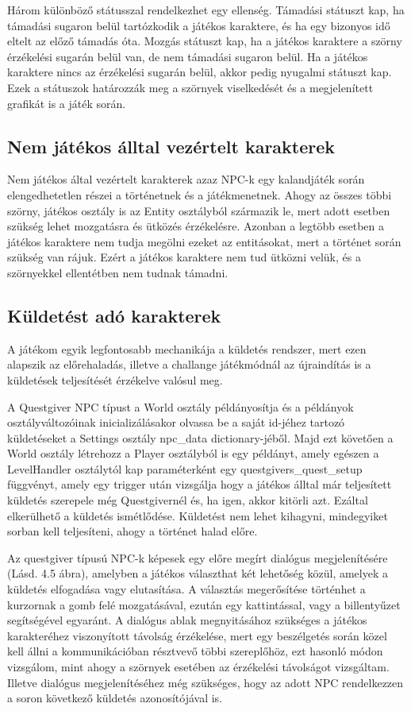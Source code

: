 Három különböző státusszal rendelkezhet egy ellenség. Támadási státuszt kap, ha támadási sugaron belül tartózkodik a játékos karaktere, és ha egy bizonyos idő eltelt az előző támadás óta. Mozgás státuszt kap, ha a játékos karaktere a szörny érzékelési sugarán belül van, de nem támadási sugaron belül. Ha a játékos karaktere nincs az érzékelési sugarán belül, akkor pedig nyugalmi státuszt kap. Ezek a státuszok határozzák meg a szörnyek viselkedését és a megjelenített grafikát is a játék során.


\subsection{Nem játékos álltal vezértelt karakterek}

\indent \indent Nem játékos által vezértelt karakterek azaz NPC-k egy kalandjáték során elengedhetetlen részei a történetnek és a játékmenetnek. Ahogy az összes többi szörny, játékos osztály is az Entity osztályból származik le, mert adott esetben szükség lehet mozgatásra és ütközés érzékelésre. Azonban a legtöbb esetben a játékos karaktere nem tudja megölni ezeket az entitásokat, mert a történet során szükség van rájuk. Ezért a játékos karaktere nem tud ütközni velük, és a szörnyekkel ellentétben nem tudnak támadni.

\subsection{Küldetést adó karakterek}

\indent \indent A játékom egyik legfontosabb mechanikája a küldetés rendszer, mert ezen alapszik az előrehaladás, illetve a challange játékmódnál az újraindítás is a küldetések teljesítését érzékelve valósul meg. 

A Questgiver NPC típust a World osztály példányosítja és a példányok osztályváltozóinak inicializálásakor olvassa be a saját id-jéhez tartozó küldetéseket a Settings osztály npc\_data dictionary-jéből. Majd ezt követően a World osztály létrehozz a Player osztályból is egy példányt, amely egészen a LevelHandler osztálytól kap paraméterként egy questgivers\_quest\_setup függvényt, amely egy trigger után vizsgálja hogy a játékos álltal már teljesített küldetés szerepel\-e még Questgivernél és, ha igen, akkor kitörli azt. Ezáltal elkerülhető a küldetés ismétlődése. Küldetést nem lehet kihagyni, mindegyiket sorban kell teljesíteni, ahogy a történet halad előre.

Az questgiver típusú NPC-k képesek egy előre megírt dialógus megjelenítésére (Lásd. 4.5 ábra), amelyben a játékos választhat két lehetőség közül, amelyek a küldetés elfogadása vagy elutasítása. A választás megerősítése történhet a kurzornak a gomb felé mozgatásával, ezután egy kattintással, vagy a billentyűzet segítségével egyaránt. A dialógus ablak megnyitásához szükséges a játékos karakteréhez viszonyított távolság érzékelése, mert egy beszélgetés során közel kell állni a kommunikációban résztvevő többi szereplőhöz, ezt hasonló módon vizsgálom, mint ahogy a szörnyek esetében az érzékelési távolságot vizsgáltam. Illetve dialógus megjelenítéséhez még szükséges, hogy az adott NPC rendelkezzen a soron következő küldetés azonosítójával is.   

